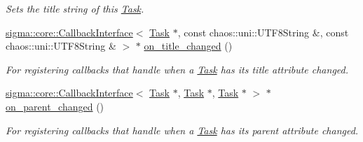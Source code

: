 \begin{DoxyCompactItemize}
\begin{DoxyCompactList}\small\item\em Sets the title string of this \hyperlink{classsigma_1_1core_1_1tasks_1_1_task}{Task}. \end{DoxyCompactList}\item 
\hyperlink{classsigma_1_1core_1_1_callback_interface}{sigma\+::core\+::\+Callback\+Interface}$<$ \hyperlink{classsigma_1_1core_1_1tasks_1_1_task}{Task} $\ast$, const chaos\+::uni\+::\+U\+T\+F8\+String \&, const chaos\+::uni\+::\+U\+T\+F8\+String \& $>$ $\ast$ \hyperlink{classsigma_1_1core_1_1tasks_1_1_task_afb01222cabc945022f095921437a10a0}{on\+\_\+title\+\_\+changed} ()
\begin{DoxyCompactList}\small\item\em For registering callbacks that handle when a \hyperlink{classsigma_1_1core_1_1tasks_1_1_task}{Task} has its title attribute changed. \end{DoxyCompactList}\item 
\hyperlink{classsigma_1_1core_1_1_callback_interface}{sigma\+::core\+::\+Callback\+Interface}$<$ \hyperlink{classsigma_1_1core_1_1tasks_1_1_task}{Task} $\ast$, \hyperlink{classsigma_1_1core_1_1tasks_1_1_task}{Task} $\ast$, \hyperlink{classsigma_1_1core_1_1tasks_1_1_task}{Task} $\ast$ $>$ $\ast$ \hyperlink{classsigma_1_1core_1_1tasks_1_1_task_a4947e26b1208f36cf4bab3f2091db786}{on\+\_\+parent\+\_\+changed} ()
\begin{DoxyCompactList}\small\item\em For registering callbacks that handle when a \hyperlink{classsigma_1_1core_1_1tasks_1_1_task}{Task} has its parent attribute changed. \end{DoxyCompactList}\end{DoxyCompactItemize}
